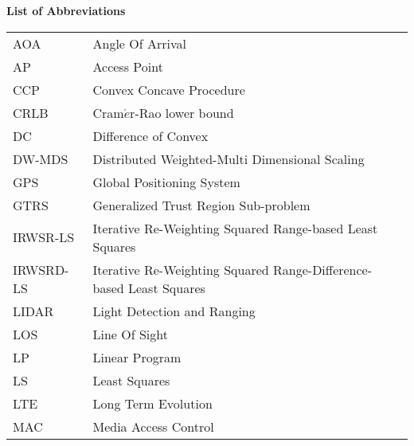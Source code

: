 \newpage


\phantom{m}

\begin{flushleft}
\begin{Huge}
\textbf{List of Abbreviations}
\end{Huge}
\end{flushleft}

\phantom{m}

\begin{longtable}[h]{l l}

AOA & Angle Of Arrival\\

AP & Access Point \\

CCP & Convex Concave Procedure \\

CRLB & Cram$\acute{e}$r-Rao  lower  bound \\

DC & Difference of Convex \\

DW-MDS & Distributed Weighted-Multi Dimensional Scaling \\

GPS & Global Positioning System \\

GTRS & Generalized Trust Region Sub-problem \\

IRWSR-LS & Iterative Re-Weighting Squared Range-based Least Squares \\

IRWSRD-LS & Iterative Re-Weighting Squared Range-Difference-based Least Squares\\

LIDAR & Light Detection and Ranging\\

LOS & Line Of Sight \\

LP & Linear Program \\

LS & Least Squares \\

LTE & Long Term Evolution \\

MAC & Media Access Control\\


\end{longtable}
